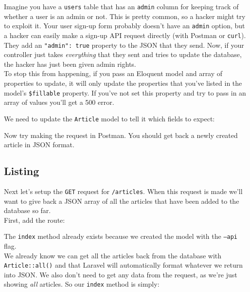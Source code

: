 Imagine you have a \texttt{users} table that has an \texttt{admin} column for keeping track of whether a user is an admin or not. This is pretty common, so a hacker might try to exploit it. Your user sign-up form probably doesn't have an \texttt{admin} option, but a hacker can easily make a sign-up API request directly (with Postman or \texttt{curl}). They add an \texttt{"admin": true} property to the JSON that they send. Now, if your controller just takes \textit{everything} that they sent and tries to update the database, the hacker has just been given admin rights.
\\

To stop this from happening, if you pass an Eloquent model and array of properties to update, it will only update the properties that you've listed in the model's \texttt{\$fillable} property. If you've not set this property and try to pass in an array of values you'll get a 500 error.

\pagebreak

We need to update the \texttt{Article} model to tell it which fields to expect:


Now try making the request in Postman. You should get back a newly created article in JSON format.



\subsection{Listing}

Next let's setup the \texttt{GET} request for \texttt{/articles}. When this request is made we'll want to give back a JSON array of all the articles that have been added to the database so far.
\\

First, add the route:


The \texttt{index} method already exists because we created the model with the \texttt{--api} flag.
\\

We already know we can get all the articles back from the database with \texttt{Article::all()} and that Laravel will automatically format whatever we return into JSON. We also don't need to get any data from the request, as we're just showing \textit{all} articles. So our \texttt{index} method is simply:


